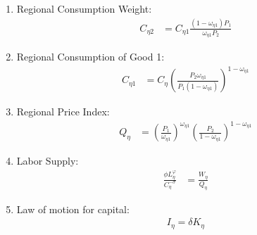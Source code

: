 \documentclass[../thesis.tex]{subfiles}
\begin{document}
\begin{enumerate}
	
	\item Regional Consumption Weight:
	\begin{align}
		C_{\eta 2} &= C_{\eta 1} \frac{(1 - \omega_{\eta 1}) P_{1}}{\omega_{\eta 1} P_{2}} \label{ext-mod:reg-ss-C-eta-12-t}
	\end{align}
	
	\item Regional Consumption of Good 1:	
	\begin{align}
		C_{\eta 1} &= C_{\eta} \left( \frac{P_{2} \omega_{\eta 1}}{P_{1} (1 - \omega_{\eta 1})} \right)^{1-\omega_{\eta 1}} \label{ext-mod:reg-ss-C-eta-1-t}
	\end{align}
	
	\item Regional Price Index:
	\begin{align}
		Q_{\eta} &= \left( \frac{P_{1}}{\omega_{\eta 1}} \right)^{\omega_{\eta 1}} \left( \frac{P_{2}}{1 -\omega_{\eta 1}} \right)^{1 -\omega_{\eta  1}} \label{ext-mod:reg-ss-total-expense-level}
	\end{align}
	
	\begin{comment}
			\item Region 1 Price Index:
		\begin{align}
			Q_{1} &= \left( \frac{P_{1}}{\omega_{11}} \right)^{\omega_{11}} \left( \frac{P_{2}}{1 -\omega_{11}} \right)^{1 -\omega_{11}} \label{ext-mod:reg-ss-total-expense-level}
		\end{align}
		
		\item Regional Terms of Trade:
		\begin{align}
			\frac{Q_{1}}{Q_{2}} &= \frac{\omega_{21}^{\omega_{21}} (1 -\omega_{21})^{1 -\omega_{21}}}{\omega_{11}^{\omega_{11}} (1 - \omega_{11})^{1 - \omega_{11}}} \label{ext-mod:reg-ss-total-expense-level-2}
		\end{align}
	\end{comment}
	
	\item Labor Supply:
	\begin{align}
		\frac{\phi L_{\eta}^{\varphi}}{C_{\eta}^{-\sigma}} &= \frac{W_{\eta}}{Q_{\eta}} \label{ext-mod:reg-ss-labor-supply}
	\end{align}
	
	\item Law of motion for capital:
	\begin{align}
		I_{\eta} = \delta K_{\eta} \label{ext-mod:reg-ss-law-of-motion-of-capital}
	\end{align}		
	

\end{enumerate}
\end{document}
